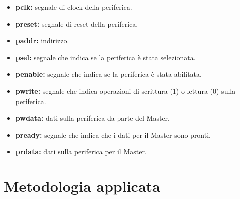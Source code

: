 \documentclass[]{IEEEtran}
\begin{document}
\begin{itemize}
    \item \textbf{pclk:} segnale di clock della periferica.
    \item \textbf{preset:} segnale di reset della periferica.
    \item \textbf{paddr:} indirizzo.
    \item \textbf{psel:} segnale che indica se la periferica è stata selezionata.
    \item \textbf{penable:} segnale che indica se la periferica è stata abilitata.
    \item \textbf{pwrite:} segnale che indica operazioni di scrittura (1) o lettura (0) sulla periferica.
    \item \textbf{pwdata:} dati sulla periferica da parte del Master.
    \item \textbf{pready:} segnale che indica che i dati per il Master sono pronti.
    \item \textbf{prdata:} dati sulla periferica per il Master.
\end{itemize}



\section{Metodologia applicata}
\end{document}
